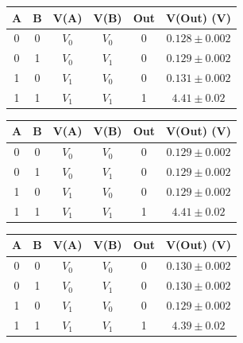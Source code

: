 \begin{table}[H]
  \centering
\begin{subtable}[H]{0.5\textwidth}
    \centering
    \begin{tabular}[t]{c  c | c  c | c  c}
      \hline
      A & B & V(A) & V(B) & Out & V(Out) (V)\\
      \hline
      0 & 0 & $V_{0}$ & $V_{0}$ & 0 & $0.128 \pm 0.002$ \\
      0 & 1 & $V_{0}$ & $V_{1}$ & 0 & $0.129 \pm 0.002$ \\
      1 & 0 & $V_{1}$ & $V_{0}$ & 0 & $0.131 \pm 0.002$ \\
      1 & 1 & $V_{1}$ & $V_{1}$ & 1 & $4.41 \pm 0.02$ \\
      \hline
    \end{tabular}
  \end{subtable}

  \vspace{.5cm}

  \begin{subtable}[H]{0.5\textwidth}
    \centering
    \begin{tabular}[t]{c  c | c  c | c  c}
      \hline
      A & B & V(A) & V(B) & Out & V(Out) (V)\\
      \hline
      0 & 0 & $V_{0}$ & $V_{0}$ & 0 & $0.129 \pm 0.002$ \\
      0 & 1 & $V_{0}$ & $V_{1}$ & 0 & $0.129 \pm 0.002$ \\
      1 & 0 & $V_{1}$ & $V_{0}$ & 0 & $0.129 \pm 0.002$ \\
      1 & 1 & $V_{1}$ & $V_{1}$ & 1 & $4.41 \pm 0.02$ \\
      \hline
    \end{tabular}
  \end{subtable}
  
  

  \vspace{.5mm}

  \begin{subtable}[H]{0.5\textwidth}
    \centering
    \begin{tabular}[t]{c  c | c  c | c  c}
      \hline
      A & B & V(A) & V(B) & Out & V(Out) (V)\\
      \hline
      0 & 0 & $V_{0}$ & $V_{0}$ & 0 & $0.130 \pm 0.002$ \\
      0 & 1 & $V_{0}$ & $V_{1}$ & 0 & $0.130 \pm 0.002$ \\
      1 & 0 & $V_{1}$ & $V_{0}$ & 0 & $0.129 \pm 0.002$ \\
      1 & 1 & $V_{1}$ & $V_{1}$ & 1 & $4.39 \pm 0.02$ \\
      \hline
    \end{tabular}
  \end{subtable}


\end{table}
